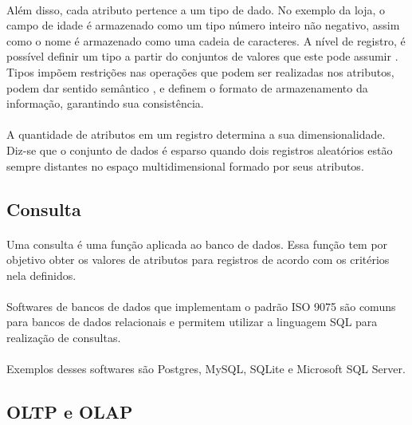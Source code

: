 \paragraph{} Além disso, cada atributo pertence a um tipo de dado. No exemplo da loja, o campo de idade é armazenado 
como um tipo número inteiro não negativo, assim como o nome é armazenado como uma cadeia de caracteres.
A nível de registro, é possível definir um tipo a partir do conjuntos de valores que este pode assumir \cite{cardelli1985types}. 
Tipos impõem restrições nas operações que podem ser realizadas nos atributos, podem dar sentido semântico \cite{donahue1979semantics},
e definem o formato de armazenamento da informação, garantindo sua consistência.

\paragraph{} A quantidade de atributos em um registro determina a sua dimensionalidade. Diz-se que o conjunto de dados é esparso quando dois registros aleatórios estão sempre distantes no espaço multidimensional formado por seus atributos.

\subsection{Consulta}

\paragraph{} Uma consulta é uma função aplicada ao banco de dados. Essa função tem por objetivo obter os valores de atributos para registros de acordo com os critérios nela definidos.

\paragraph{} Softwares de bancos de dados que implementam o padrão ISO 9075 são comuns para bancos de dados relacionais e permitem utilizar a linguagem SQL para realização de consultas.

\paragraph{} Exemplos desses softwares são Postgres, MySQL, SQLite e Microsoft SQL Server.

\subsection{OLTP e OLAP}

